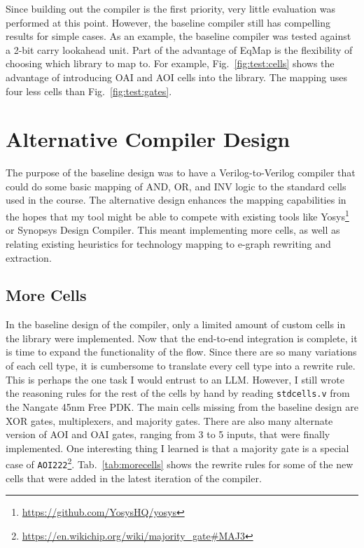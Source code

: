 \documentclass[10pt,letterpaper]{article}
\begin{document}
Since building out the compiler is the first priority, very little evaluation
was performed at this point. However, the baseline compiler still has
compelling results for simple cases. As an example, the baseline compiler was
tested against a 2-bit carry lookahead unit. Part of the advantage of EqMap is
the flexibility of choosing which library to map to. For example,
Fig.~\ref{fig:test:cells} shows the advantage of introducing OAI and AOI cells
into the library. The mapping uses four less cells than
Fig.~\ref{fig:test:gates}.

\section{Alternative Compiler Design}\label{sec:alt}

The purpose of the baseline design was to have a Verilog-to-Verilog compiler
that could do some basic mapping of AND, OR, and INV logic to the standard
cells used in the course. The alternative design enhances the mapping
capabilities in the hopes that my tool might be able to compete with existing
tools like
Yosys\footnote{\href{https://github.com/YosysHQ/yosys}{https://github.com/YosysHQ/yosys}}
or Synopsys Design Compiler. This meant implementing more cells, as well as
relating existing heuristics for technology mapping to e-graph rewriting and
extraction.

\subsection{More Cells}\label{sec:alt:cells}

In the baseline design of the compiler, only a limited amount of custom cells
in the library were implemented. Now that the end-to-end integration is
complete, it is time to expand the functionality of the flow. Since there are
so many variations of each cell type, it is cumbersome to translate every cell
type into a rewrite rule. This is perhaps the one task I would entrust to an
LLM. However, I still wrote the reasoning rules for the rest of the cells by
hand by reading \texttt{stdcells.v} from the Nangate 45nm Free PDK. The main
cells missing from the baseline design are XOR gates, multiplexers, and
majority gates. There are also many alternate version of AOI and OAI gates,
ranging from 3 to 5 inputs, that were finally implemented. One interesting
thing I learned is that a majority gate is a special case of
\texttt{AOI222}\footnote{\href{https://en.wikichip.org/wiki/majority\_gate\#MAJ3}{https://en.wikichip.org/wiki/majority\_gate\#MAJ3}}.
Tab.~\ref{tab:morecells} shows the rewrite rules for some of the new cells that
were added in the latest iteration of the compiler.
\end{document}
